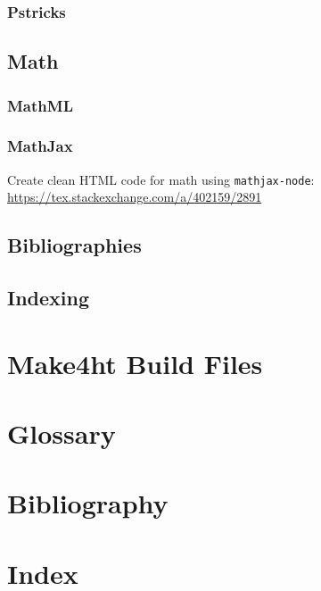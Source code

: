 \documentclass{book}
\begin{document}
\subsection{Pstricks}

\section{Math}
\subsection{MathML}
\subsection{MathJax}

Create clean HTML code for math using \verb|mathjax-node|:
\url{https://tex.stackexchange.com/a/402159/2891}

\section{Bibliographies}
\section{Indexing}

\chapter{Make4ht Build Files}

\chapter{Glossary}
\chapter{Bibliography}
\chapter{Index}
\end{document}
